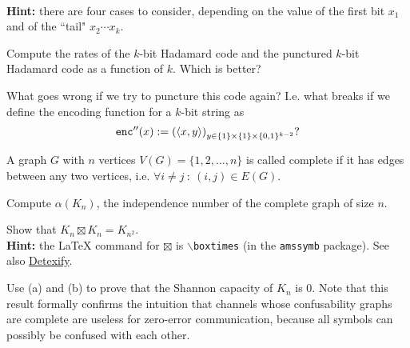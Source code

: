 \documentclass[a4paper,10pt,landscape,twocolumn]{scrartcl}
\begin{document}
\begin{exercise}
\begin{subex}[(3pt)]
	\\\textbf{Hint:} there are four cases to consider, depending on the value of the first bit $x_1$ and of the ``tail" $x_2\cdots x_k$.
	\end{subex}
	\begin{subex}[(2pt)]
	Compute the rates of the $k$-bit Hadamard code and the punctured $k$-bit Hadamard code as a function of $k$. Which is better?
	\end{subex}
	\begin{subex}[(1pt)]
	What goes wrong if we try to puncture this code again? I.e. what breaks if we define the encoding function for a $k$-bit string as
	\[
	\mathtt{enc}''(x) := \left(\langle x, y\rangle\right)_{y \in \{1\} \times \{1\} \times \{0,1\}^{k-2}}?
	\]
	\end{subex}
\end{exercise}

\begin{exercise}
A graph $G$ with $n$ vertices $V(G) = \{1,2,...,n\}$ is called complete if it has edges between any two vertices, i.e. $\forall i \neq j \ : \ (i,j) \in E(G)$.
	\begin{subex}[(2pt)]
	Compute $\alpha(K_n)$, the independence number of the complete graph of size $n$.
	\end{subex}
	\begin{subex}[(2pt)]
	Show that $K_n \boxtimes K_n = K_{n^2}$.
	\\\textbf{Hint:} the \LaTeX{} command for $\boxtimes$ is \texttt{$\backslash$boxtimes} (in the \texttt{amssymb} package). See also \href{http://detexify.kirelabs.org/classify.html}{Detexify}.
	\end{subex}
	\begin{subex}[(2pt)]
	Use (a) and (b) to prove that the Shannon capacity of $K_n$ is 0. Note that this result formally confirms the intuition that channels whose confusability graphs are complete are useless for zero-error communication, because all symbols can possibly be confused with each other.
	\end{subex}
\end{exercise}
\end{document}
